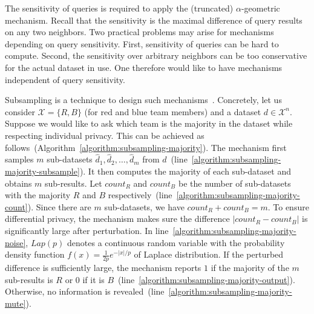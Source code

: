 
The sensitivity of queries is required to apply the (truncated)
$\alpha$-geometric mechanism. Recall that the sensitivity 
is the maximal difference of query results on any two neighbors. 
Two practical problems may arise for
mechanisms depending on query sensitivity. First, 
sensitivity of queries can be hard to compute. Second,
the sensitivity over arbitrary neighbors can be too conservative for
the actual dataset in use. One therefore would like to have
mechanisms independent of query sensitivity.

Subsampling is a technique to design such mechanisms~\cite{DR:14:AFDP}. Concretely, let
us consider $\mathcal{X} = \{ R, B \}$ (for red and blue team members) and a
dataset $d \in \mathcal{X}^n$. Suppose we would like to ask which team
is the majority in the dataset while respecting individual
privacy. This can be achieved as
follows~(Algorithm~\ref{algorithm:subsampling-majority}). The
mechanism first samples $m$ 
sub-datasets $\hat{d}_1, \hat{d}_2, \ldots, \hat{d}_m$ from
$d$~(line~\ref{algorithm:subsampling-majority-subsample}). 
It then computes the majority of each sub-dataset and obtains $m$
sub-results. Let $\mathit{count}_R$ and $\mathit{count}_B$ be the
number of sub-datasets with the majority $R$ and $B$
respectively~(line~\ref{algorithm:subsampling-majority-count}). 
Since there are $m$ sub-datasets, we have
$\mathit{count}_R + \mathit{count}_B = m$. To ensure differential
privacy, the mechanism makes sure the difference $| \mathit{count}_R -
\mathit{count}_B |$ is significantly large after perturbation. In
line~\ref{algorithm:subsampling-majority-noise},
$\mathit{Lap}(p)$ denotes a continuous random
variable with the probability density
function $f(x) = \frac{1}{2p}e^{-|x|/p}$ of Laplace distribution.
If the perturbed difference is sufficiently large,
the mechanism reports $1$ if the majority of the $m$
sub-results is
$R$ or $0$ if it is
$B$~(line~\ref{algorithm:subsampling-majority-output}). Otherwise,  no
information is 
revealed~(line~\ref{algorithm:subsampling-majority-mute}).

